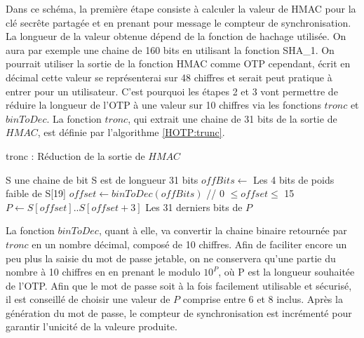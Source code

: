 \documentclass{../res/univ-projet}
\begin{document}
  Dans ce schéma, la première étape consiste à calculer la valeur de HMAC pour la clé secr\^ete partagée et en prenant pour message le compteur de synchronisation. La 
  longueur de la valeur obtenue dépend de la fonction de hachage utilisée. On aura par exemple une chaine de 160 bits en utilisant la fonction SHA\_1.
  On pourrait utiliser la sortie de la fonction HMAC comme OTP cependant, écrit en décimal cette valeur se représenterai sur 48 chiffres et serait peut pratique à entrer 
  pour un utilisateur. C'est pourquoi les étapes 2 et 3 vont permettre de réduire la longueur de l'OTP à une valeur sur 10 chiffres via les fonctions $tronc$ et 
  $binToDec$. La fonction $tronc$, qui extrait une chaine de 31 bits de la sortie de $HMAC$, est définie par l'algorithme \ref{HOTP:trunc}.
  
  \begin{algorithm}
    \caption{tronc : Réduction de la sortie de $HMAC$}
    \label{HOTP:trunc}
    
    \begin{algorithmic}
      \REQUIRE S une chaine de bit
      \ENSURE S est de longueur 31 bits
      \STATE $offBits \leftarrow$ Les 4 bits de poids faible de S[19]
      \STATE $offset \leftarrow binToDec(offBits)$ // 0 $\leq offset \leq$ 15
      \STATE $P \leftarrow S[offset]..S[offset + 3]$ \newline
      \RETURN Les 31 derniers bits de $P$
    \end{algorithmic}
  \end{algorithm}

  La fonction $binToDec$, quant à elle, va convertir la chaine binaire retournée par $tronc$ en un nombre décimal, composé de 10 chiffres. Afin de faciliter encore un peu 
  plus la saisie du mot de passe jetable, on ne conservera qu'une partie du nombre à 10 chiffres en en prenant le modulo $10^P$, o\`u P est la longueur souhaitée de l'OTP.
  Afin que le mot de passe soit à la fois facilement utilisable et sécurisé, il est conseillé de choisir une valeur de $P$ comprise entre 6 et 8 inclus.
  Après la génération du mot de passe, le compteur de synchronisation est incrémenté pour garantir l'unicité de la valeure produite.
  
\end{document}
